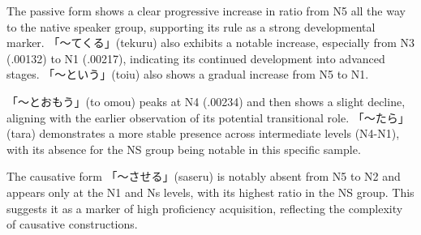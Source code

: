 The passive form shows a clear progressive increase in ratio from N5 all the way to the native speaker group,
supporting
its
rule as a strong developmental marker. 「〜てくる」(tekuru) also exhibits a notable increase, especially from N3 (.00132)
to N1 (.00217), indicating its continued development into advanced stages. 「〜という」(toiu) also shows a gradual
increase from N5 to N1.

「〜とおもう」(to omou) peaks at N4 (.00234) and then shows a slight decline, aligning with the earlier observation of its
potential transitional role. 「〜たら」(tara) demonstrates a more stable presence across intermediate levels (N4-N1),
with its absence for the NS group being notable in this specific sample.

The causative form 「〜させる」(saseru) is notably absent from N5 to N2 and appears only at the N1 and Ns levels, with its
highest ratio in the NS group. This suggests it as a marker of high proficiency acquisition, reflecting the
complexity of causative constructions.

\begin{table}[h!]
\centering
\small
{}
\caption{Top Grammar Forms by Ratio Across JLPT Levels (Top 6 per level)}
\label{tab:CF-top6-per-level}
\end{table}



